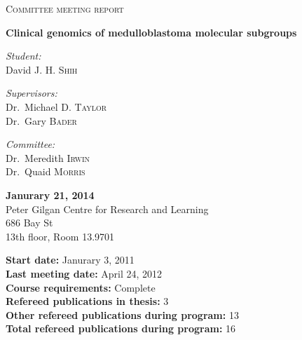 \begin{titlepage}

\setlength{\topmargin}{30mm}

\begin{center}
 
\textsc{\Large Committee meeting report}\bigskip

{\huge \bfseries Clinical genomics of medulloblastoma molecular subgroups}\\[10mm]

\begin{minipage}{0.6\textwidth}
\begin{multicols}{2}
	\begin{flushleft}
		\large \emph{Student:}\\
		David J. H. \textsc{Shih}
	\end{flushleft}
	\vfill
	\columnbreak
	\begin{flushright}
		\large \emph{Supervisors:}\\
		Dr.~Michael D. \textsc{Taylor}\\
		Dr.~Gary \textsc{Bader}\\
	\end{flushright}
	\begin{flushright}
		\large \emph{Committee:}\\
		Dr.~Meredith \textsc{Irwin}\\
		Dr.~Quaid \textsc{Morris}
	\end{flushright}
\end{multicols}
\end{minipage}

\vspace{20mm}

{ \large 
\textbf{Janurary 21, 2014}\\
\medskip
Peter Gilgan Centre for Research and Learning\\
686 Bay St\\
13th floor, Room 13.9701
}

\vspace{40mm}

\begin{flushleft}
	{ \large
	\textbf{Start date:} Janurary 3, 2011\\
	\textbf{Last meeting date:} April 24, 2012\\
	\medskip
	\textbf{Course requirements:} Complete\\
	\medskip
	\textbf{Refereed publications in thesis:} 3\\
	\textbf{Other refereed publications during program:} 13\\
	\textbf{Total refereed publications during program:} 16\\
	}
\end{flushleft}


\end{center}

\end{titlepage}
